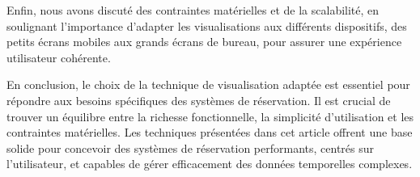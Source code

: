 \documentclass[runningheads]{llncs}
\begin{document}
Enfin, nous avons discuté des contraintes matérielles et de la scalabilité, en soulignant l'importance d'adapter les visualisations aux différents dispositifs, des petits écrans mobiles aux grands écrans de bureau, pour assurer une expérience utilisateur cohérente.

En conclusion, le choix de la technique de visualisation adaptée est essentiel pour répondre aux besoins spécifiques des systèmes de réservation. Il est crucial de trouver un équilibre entre la richesse fonctionnelle, la simplicité d'utilisation et les contraintes matérielles. Les techniques présentées dans cet article offrent une base solide pour concevoir des systèmes de réservation performants, centrés sur l'utilisateur, et capables de gérer efficacement des données temporelles complexes.




\end{document}
